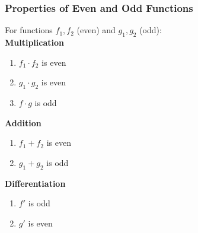 \subsubsection{Properties of Even and Odd Functions}
For functions $f_1, f_2$ (even) and $g_1, g_2$ (odd):\\
\textbf{Multiplication}
\begin{enumerate}
    \item $f_1\cdot f_2$ is even
    \item $g_1\cdot g_2$ is even
    \item $f\cdot g$ is odd
\end{enumerate}
\textbf{Addition}
\begin{enumerate}
    \item $f_1+f_2$ is even
    \item $g_1+g_2$ is odd
\end{enumerate}
\textbf{Differentiation}
\begin{enumerate}
    \item $f'$ is odd
    \item $g'$ is even
\end{enumerate}


